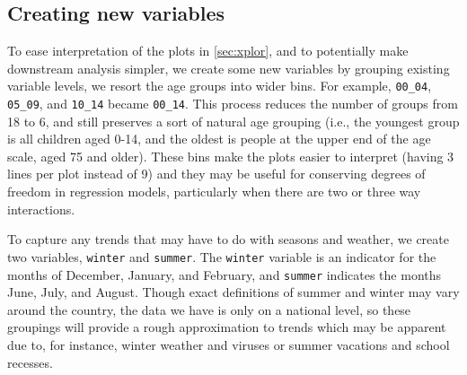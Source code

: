 \documentclass[11pt]{article}
\begin{document}
\subsection{Creating new variables}\label{sec:new_vars}
To ease interpretation of the plots in \cref{sec:xplor}, and to potentially make downstream analysis simpler, we create some new variables by grouping existing variable levels, we resort the age groups into wider bins.
For example, \verb+00_04+,\verb+ 05_09+, and \verb+10_14+ became \verb+00_14+. 
This process reduces the number of groups from 18 to 6, and still preserves a sort of natural age grouping (i.e., the youngest group is all children aged 0-14, and the oldest is people at the upper end of the age scale, aged 75 and older).
These bins make the plots easier to interpret (having 3 lines per plot instead of 9) and they may be useful for conserving degrees of freedom in regression models, particularly when there are two or three way interactions.

To capture any trends that may have to do with seasons and weather, we create two variables, \verb+winter+ and \verb+summer+. 
The \verb+winter+ variable is an indicator for the months of December, January, and February, and \verb+summer+ indicates the months June, July, and August.
Though exact definitions of summer and winter may vary around the country, the data we have is only on a national level, so these groupings will provide a rough approximation to trends which may be apparent due to, for instance, winter weather and viruses or summer vacations and school recesses.
\end{document}
